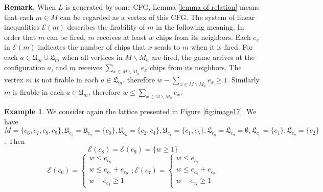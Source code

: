 \documentclass{article}
\theoremstyle{definition}
\newtheorem{examp}{Example}
\newcommand\down[1]{e_{#1}}
\newcommand\set[1]{\{ #1 \}}
\begin{document}
\textbf{Remark.} When $L$ is generated by some CFG, Lemma \ref{lemma of relation} means that each $m \in M$ can be regarded as a vertex of this CFG. The system of linear inequalities $\mathcal{E}(m)$ describes the firability of $m$ in the following meaning. In order that $m$ can be fired, $m$ receives at least $w$ chips from its neighbors. Each $e_x$ in $\mathcal{E}(m)$ indicates the number of chips that $x$ sends to $m$ when it is fired. For each $a \in \mathfrak{U}_m\cup \mathfrak{L}_m$ when all vertices in $M\backslash M_a$ are fired, the game arrives at the configuration $a$, and $m$ receives $\underset{x \in M\backslash M_a}{\sum} e_x$ chips from its neighbors. The vertex $m$ is not firable in each $a \in \mathfrak{L}_m$, therefore $w-\underset{x \in M\backslash M_a}{\sum}e_x\geq 1$. Similarly $m$ is firable in each $ a \in \mathfrak{U}_m$, therefore $w \leq \underset{x \in M\backslash M_a}{\sum} e_x$. 
\begin{examp}
\label{first example}
We consider again the lattice presented in Figure \ref{fig:image17}.  We have $M=\set{c_6,c_7, c_{8}, c_{9}}, \mathfrak{U}_{c_8}=\mathfrak{U}_{c_9}=\set{c_0} ,\mathfrak{U}_{c_6}= \set{c_2,c_4}, \mathfrak{U}_{c_7}=\set{c_1,c_5}, \mathfrak{L}_{c_8}=\mathfrak{L}_{c_{9}}=\emptyset,\mathfrak{L}_{c_6}=\set{c_1},\mathfrak{L}_{c_7}=\set{c_2}$ . Then 
$$
\mathcal{E}(c_8)=\mathcal{E}(c_9)=\set{w\geq 1}
$$
$$
\mathcal{E}(c_6)=\left\{
\begin{array}{c}
w \leq \down{c_8}\\
w \leq \down{c_7}+\down{c_9}\\
w-\down{c_9}\geq 1
\end{array}
\right. ;
\mathcal{E}(c_7)=\left\{
\begin{array}{c}
w \leq \down{c_9}\\
w\leq \down{c_6}+\down{c_8}\\
w-\down{c_8}\geq 1
\end{array}
\right. 
$$
\end{examp}
\end{document}
